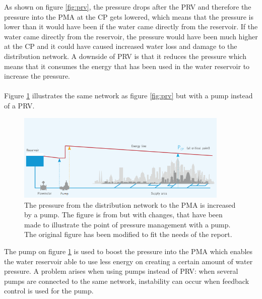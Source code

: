As shown on figure \ref{fig:prv}, the pressure drops after the PRV and therefore the pressure into the PMA at the CP gets lowered, which means that the pressure is lower than it would have been if the water came directly from the reservoir. If the water came directly from the reservoir, the pressure would have been much higher at the CP and it could have caused increased water loss and damage to the distribution network. A downside of PRV is that it reduces the pressure which means that it consumes the energy that has been used in the water reservoir to increase the pressure. 
\\
\\
Figure \ref{fig:pump} illustrates the same network as figure \ref{fig:prv} but with a pump instead of a PRV.

\begin{figure}[H]
\centering
\includegraphics[width=0.9\textwidth]{report/introduction/pictures/pump.png}
\caption{ The pressure from the distribution network to the PMA is increased by a pump. The figure is from \cite{guidelines_waterloss} but with changes, that have been made to illustrate the point of pressure management with a pump. The original figure \cite{guidelines_waterloss} has been modified to fit the needs of the report.}
\label{fig:pump}
\end{figure}

The pump on figure \ref{fig:pump} is used to boost the pressure into the PMA which enables the water reservoir able to use less energy on creating a certain amount of water pressure. A problem arises when using pumps instead of PRV: when several pumps are connected to the same network, instability can occur when feedback control is used for the pump.  




